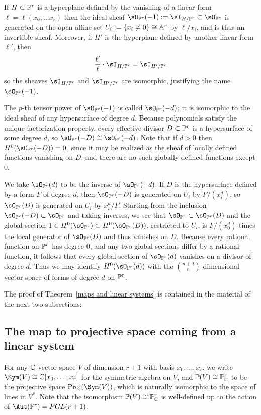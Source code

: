 \begin{example} \label{linear systems on Pr} If $H\subset \PP^{r}$ is a hyperplane defined by the vanishing of a linear form $\ell = \ell(x_{0}, \dots x_{r})$ then the ideal sheaf $\sO_{\PP^{r}}(-1) := \sI_{H/\PP^{r}}\subset \sO_{\PP^{r}}$ is generated on the open affine set 
$U_{i}:= \{x_{i}\neq 0\} \cong \AA^{r}$
by $\ell/x_{i}$, and is thus an invertible sheaf. 
Moreover, if $H'$ is the hyperplane defined by another linear form $\ell'$, then 
$$
\frac{\ell'}{\ell}\cdot\sI_{H/\PP^{r}} = \sI_{H'/\PP^{r}} 
$$
so the sheaves $\sI_{H/\PP^{r}}$ and $\sI_{H'/\PP^{r}} $ are isomorphic, justifying the name $\sO_{\PP^{r}}(-1)$.

The $p$-th tensor power of $\sO_{\PP^{r}}(-1)$ is called $\sO_{\PP^{r}}(-d)$; it is isomorphic to the
ideal sheaf of any hypersurface of degree $d$. Because polynomials satisfy the unique factorization property,
every effective divisor $D\subset \PP^{r}$ is a hypersurface of some degree $d$, so
$\sO_{\PP^{r}}(-D) \cong \sO_{\PP^{r}}(-d)$. Note that if $d>0$ then $H^{0}(\sO_{\PP^{r}}(-D)) = 0$, since it may be realized
as the sheaf of locally defined functions vanishing on $D$, and there are no such
globally defined functions except 0.

We take $\sO_{\PP^{r}}(d)$ to be the inverse of $\sO_{\PP^{r}}(-d)$. If $D$ is the hypersurface defined by 
a form $F$ of degree $d$, then $\sO_{\PP^{r}}(-D)$ is generated on $U_{i}$ by $F/(x_{i}^{d})$, so
$\sO_{\PP^{r}}(D)$ is generated on $U_{i}$ by $x_{i}^{d}/F$.
Starting from the inclusion 
$
\sO_{\PP^{r}}(-D) \subset \sO_{\PP^{r}}
$
and taking inverses, we see that 
$
\sO_{\PP^{r}} \subset \sO_{\PP^{r}}(D)
$
and the global section $1\in H^0(\sO_{\PP^{r}})\subset H^0(\sO_{\PP^{r}}(D))$, restricted to
$U_{i}$, is $F/(x_{0}^{d})$ times the local generator of $\sO_{\PP^{r}}(D)$ and thus vanishes on $D$.
 Because every
rational function on $\PP^{r}$ has degree 0, and any two global sections differ by a rational
function, it follows that every global section of $\sO_{\PP^{r}}(d)$ vanishes on a divisor of degree $d$. Thus
we may identify $H^{0}(\sO_{\PP^{r}}(d))$ with the ${n+d\choose n}$-dimensional vector space of forms of degree $d$ on $\PP^{r}$.
\end{example}

The proof of Theorem~\ref{maps and linear systems} is contained in the material of the next two subsections:

\subsection{The map to projective space coming from a linear system} 
For any $\CC$-vector space $V$ of dimension $r+1$ with basis $x_{0}, \dots, x_{r}$, we write $\Sym(V) \cong \CC[x_{0},\dots, x_{r}]$ for the symmetric algebra on $V$, and
$\PP(V)\cong \PP^{r}_{\CC}$ to be the projective space ${\rm Proj}(\Sym(V))$, which is naturally isomorphic to the
space of lines in $V^{*}$. Note that the isomorphism $\PP(V)\cong \PP^{r}_{\CC}$ is well-defined up to the action
of $\Aut(\PP^r) = PGL(r+1)$.


